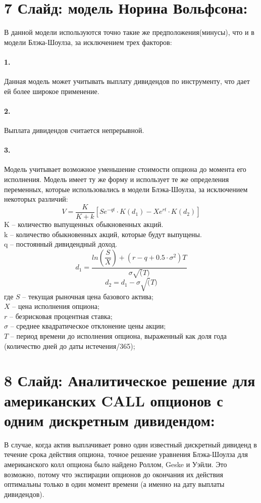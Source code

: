 \documentclass[a4paper]{article}
\begin{document}
\section*{7 Слайд: модель Норина Вольфсона:}
В данной модели используются точно такие же предположения(минусы), что и в модели Блэка-Шоулза, за исключением трех факторов:
\paragraph*{1.} Данная модель может учитывать выплату дивидендов по инструменту, что дает ей более широкое применение.
\paragraph*{2.} Выплата дивидендов считается непрерывной.
\paragraph*{3.} Модель учитывает возможное уменьшение стоимости опциона до момента его исполнения.
Модель имеет ту же форму и использует те же определения переменных, которые использовались в модели Блэка-Шоулза, за исключением некоторых различий:
\[V = \dfrac{K}{K+k} \left[ Se^{-qt} \cdot K(d_1) - Xe^{rt} \cdot K(d_2)\right]\]
K -- количество выпущенных обыкновенных акций. \\
k -- количество обыкновенных акций, которые будут выпущены.\\
q -- постоянный дивидендный доход.
\[d_1 = \dfrac{ ln \left( \dfrac{S}{X} \right) + (r - q + 0.5 \cdot \sigma^2) T}{\sigma \sqrt(T)}\]
\[d_2 = d_1 - \sigma \sqrt(T)\]
где $S$ -- текущая рыночная цена базового актива; \\
$X$ – цена исполнения опциона; \\ 
$r$ -- безрисковая процентная ставка; \\
$\sigma$ -- среднее квадратическое отклонение цены акции; \\
$T$ -- период времени до исполнения опциона, выраженный как доля года (количество дней до даты истечения/365);

\section*{8 Слайд: Аналитическое решение для американских CALL опционов с одним дискретным дивидендом:}
В случае, когда актив выплачивает ровно один известный дискретный дивиденд в течение срока действия опциона, точное решение уравнения Блэка-Шоулза для американского колл опциона было найдено Роллом, Geske и Уэйли. Это возможно, потому что экспирации опционов до окончания их действия оптимальны только в один момент времени (а именно на дату выплаты дивидендов).
\end{document}
